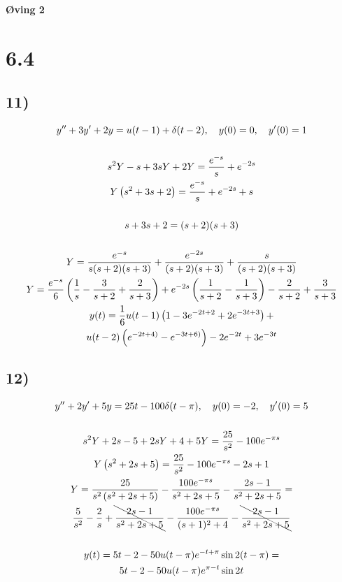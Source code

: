 \begin{center}
	\LARGE{\textbf{Øving 2}}
\end{center}


\section*{6.4}

\subsection*{11)}

\begin{gather*}
	y'' + 3 y' + 2 y = u(t - 1) + \delta(t - 2), \quad
	y(0) = 0, \quad
	y'(0) = 1 \\ \\
	s^2 Y - s + 3 s Y + 2 Y = \frac{e^{-s}}{s} + e^{-2 s} \\
	Y \left( s^2 + 3 s + 2 \right) = \frac{e^{-s}}{s} + e^{-2 s} + s \\ \\
	s + 3 s + 2 = (s + 2) (s + 3) \\ \\
	Y = \frac{e^{-s}}{s (s + 2) (s + 3)} +
	\frac{e^{-2 s}}{(s + 2) (s + 3)} +
	\frac{s}{(s + 2) (s + 3)} \\
	Y = \frac{e^{-s}}{6} \left( \frac{1}{s} - \frac{3}{s + 2} + \frac{2}{s + 3} \right) +
	e^{-2 s} \left( \frac{1}{s + 2} - \frac{1}{s + 3} \right) -
	\frac{2}{s + 2} + \frac{3}{s + 3} \\
	y(t) = \frac{1}{6} u(t - 1) \left( 1 - 3 e^{-2 t + 2} + 2 e^{-3 t + 3} \right) + \\
	u(t - 2) \left( e^{-2 t + 4)} - e^{-3 t + 6)} \right) -
	2 e^{-2 t} + 3 e^{-3 t}
\end{gather*}


\subsection*{12)}


\begin{gather*}
	y'' + 2 y' + 5 y = 25 t - 100 \delta (t - \pi), \quad
	y(0) = -2, \quad
	y'(0) = 5 \\ \\
	s^2 Y + 2 s - 5 + 2 s Y + 4 + 5Y = \frac{25}{s^2} - 100 e^{-\pi s} \\
	Y \left( s^2 + 2 s + 5 \right) =
	\frac{25}{s^2} - 100 e^{-\pi s} - 2 s + 1 \\
	Y = \frac{25}{s^2 \left( s^2 + 2 s + 5 \right)} -
	\frac{100 e^{-\pi s}}{s^2 + 2 s + 5} -
	\frac{2 s - 1}{s^2 + 2 s + 5} = \\
	\frac{5}{s^2} - \frac{2}{s} + \bcancel{\frac{2 s - 1}{s^2 + 2 s + 5}} -
	\frac{100 e^{-\pi s}}{(s + 1)^2 + 4} -
	\bcancel{\frac{2 s - 1}{s^2 + 2 s + 5}} \\ \\
	y(t) = 5 t - 2 - 50 u(t - \pi) e^{-t + \pi} \sin{2(t - \pi)} =\\
	5 t - 2 - 50 u(t - \pi) e^{\pi - t} \sin{2 t}
\end{gather*}



